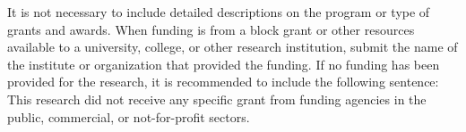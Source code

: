 \documentclass[preprint,review,12pt]{dependencies/elsarticle}
\begin{document}
It is not necessary to include detailed descriptions on the program or type of grants and awards.
When funding is from a block grant or other resources available to a university, college, or other research institution, submit the name of the institute or organization that provided the funding.
If no funding has been provided for the research, it is recommended to include the following sentence:
This research did not receive any specific grant from funding agencies in the public, commercial, or not-for-profit sectors.
%
%
\appendix


%
\end{document}
